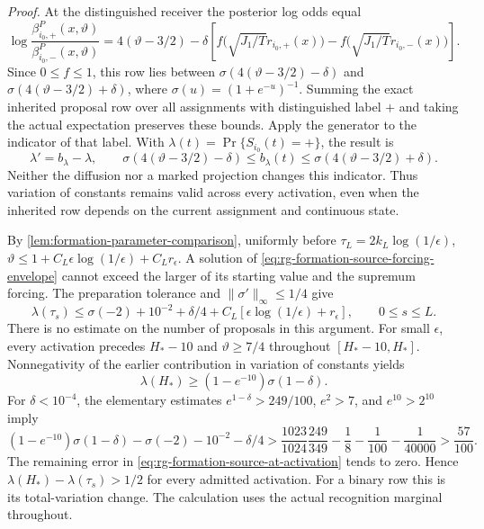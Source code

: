 \emph{Proof.}
At the distinguished receiver the posterior log odds equal
\begin{equation}
 \log\frac{\beta^P_{i_0,+}(x,\vartheta)}
               {\beta^P_{i_0,-}(x,\vartheta)}
 =4(\vartheta-3/2)
  -\delta\left[
 f\bigl(\sqrt{J_1/T}r_{i_0,+}(x)\bigr)
 -f\bigl(\sqrt{J_1/T}r_{i_0,-}(x)\bigr)\right].
 \label{eq:rg-formation-source-log-odds}
\end{equation}
Since $0\le f\le1$, this row lies between
$\sigma(4(\vartheta-3/2)-\delta)$ and
$\sigma(4(\vartheta-3/2)+\delta)$, where
$\sigma(u)=(1+e^{-u})^{-1}$. Summing the exact inherited proposal
row over all assignments with distinguished label $+$ and taking
the actual expectation preserves these bounds. Apply the generator
to the indicator of that label. With
$\lambda(t)=\Pr\{S_{i_0}(t)=+\}$, the result is
\begin{equation}
 \lambda'=b_\lambda-\lambda,
 \qquad
 \sigma(4(\vartheta-3/2)-\delta)
 \le b_\lambda(t)\le
 \sigma(4(\vartheta-3/2)+\delta).
 \label{eq:rg-formation-source-forcing-envelope}
\end{equation}
Neither the diffusion nor a marked projection changes this
indicator. Thus variation of constants remains valid across every
activation, even when the inherited row depends on the current
assignment and continuous state.

By \cref{lem:formation-parameter-comparison}, uniformly before
$\tau_L=2k_L\log(1/\epsilon)$,
$\vartheta\le1+C_L\epsilon\log(1/\epsilon)+C_Lr_\epsilon$.
A solution of \cref{eq:rg-formation-source-forcing-envelope} cannot
exceed the larger of its starting value and the supremum forcing.
The preparation tolerance and $\|\sigma'\|_\infty\le1/4$ give
\begin{equation}
 \lambda(\tau_s)
 \le\sigma(-2)+10^{-2}+\delta/4
       +C_L[\epsilon\log(1/\epsilon)+r_\epsilon],
 \qquad 0\le s\le L.
 \label{eq:rg-formation-source-at-activation}
\end{equation}
There is no estimate on the number of proposals in this argument.
For small $\epsilon$, every activation precedes $H_*-10$ and
$\vartheta\ge7/4$ throughout $[H_*-10,H_*]$. Nonnegativity of
the earlier contribution in variation of constants yields
\begin{equation}
 \lambda(H_*)\ge(1-e^{-10})\sigma(1-\delta).
 \label{eq:rg-formation-source-final-mass}
\end{equation}
For $\delta<10^{-4}$, the elementary estimates
$e^{1-\delta}>249/100$, $e^2>7$, and $e^{10}>2^{10}$ imply
\begin{equation}
 (1-e^{-10})\sigma(1-\delta)-\sigma(-2)
       -10^{-2}-\delta/4
 >\frac{1023}{1024}\frac{249}{349}
       -\frac18-\frac1{100}-\frac1{40000}
 >\frac{57}{100}.
 \label{eq:rg-formation-source-strict-margin}
\end{equation}
The remaining error in
\cref{eq:rg-formation-source-at-activation} tends to zero. Hence
$\lambda(H_*)-\lambda(\tau_s)>1/2$ for every admitted activation.
For a binary row this is its total-variation change. The calculation
uses the actual recognition marginal throughout.

